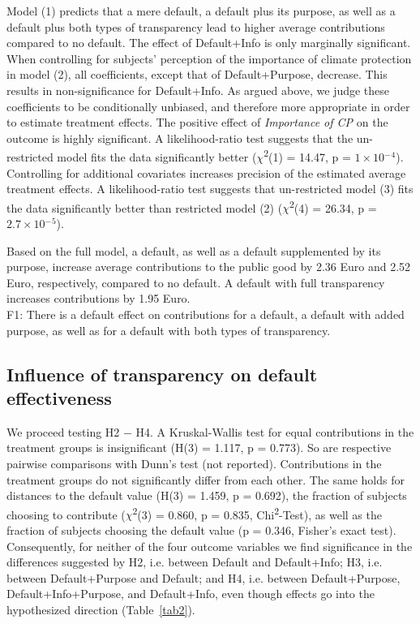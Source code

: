 \documentclass[review, authoryear,12pt]{elsarticle}
\begin{document}
Model (1) predicts that a mere default, a default plus its purpose, as well as a default plus both types of transparency lead to higher average contributions compared to no default. The effect of Default+Info is only marginally significant. When controlling for subjects' perception of the importance of climate protection in model (2), all coefficients, except that of Default+Purpose, decrease. This results in non-significance for Default+Info. As argued above, we judge these coefficients to be conditionally unbiased, and therefore more appropriate in order to estimate treatment effects. The positive effect of \textit{Importance of CP} on the outcome is highly significant. A likelihood-ratio test suggests that the un-restricted model fits the data significantly better ($\chi$\textsuperscript{2}(1) = 14.47, p = $1\times 10$$^-$$^4$). Controlling for additional covariates increases precision of the estimated average treatment effects. A likelihood-ratio test suggests that un-restricted model (3) fits the data significantly better than restricted model (2) ($\chi$\textsuperscript{2}(4) = 26.34, p = $2.7\times 10$$^-$$^5$).

Based on the full model, a default, as well as a default supplemented by its purpose, increase average contributions to the public good by 2.36 Euro and 2.52 Euro, respectively, compared to no default. A default with full transparency increases contributions by 1.95 Euro. \\

F1: There is a default effect on contributions for a default, a default with added purpose, as well as for a default with both types of transparency. \\

\subsection{Influence of transparency on default effectiveness}
We proceed testing H2 $-$ H4. A Kruskal-Wallis test for equal contributions in the treatment groups is insignificant (H(3) = 1.117, p = 0.773). So are respective pairwise comparisons with Dunn's test (not reported). Contributions in the treatment groups do not significantly differ from each other. The same holds for distances to the default value (H(3) = 1.459, p = 0.692), the fraction of subjects choosing to contribute ($\chi$\textsuperscript{2}(3) = 0.860, p = 0.835, Chi\textsuperscript{2}-Test), as well as the fraction of subjects choosing the default value (p = 0.346, Fisher's exact test). Consequently, for neither of the four outcome variables we find significance in the differences suggested by H2, i.e. between Default and Default+Info; H3, i.e. between Default+Purpose and Default; and H4, i.e. between Default+Purpose, Default+Info+Purpose, and Default+Info, even though effects go into the hypothesized direction (Table~\ref{tab2}).
\end{document}
